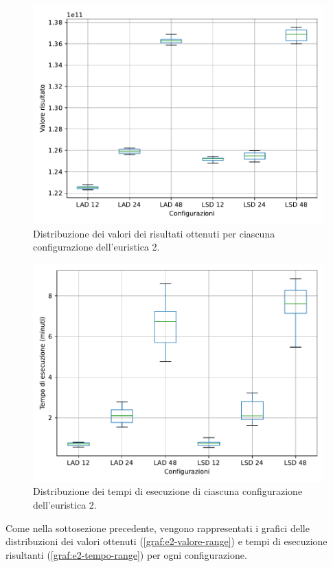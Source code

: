 \begin{figure}[t]
    \centering
    \includegraphics[scale=0.70]{img/grafico-e2-valore.pdf}
    \caption{Distribuzione dei valori dei risultati ottenuti per ciascuna configurazione dell'euristica 2.}
    \label{graf:e2-valore-range}
\end{figure}

\begin{figure}[t]
    \centering
    \includegraphics[scale=0.70]{img/grafico-e2-tempo.pdf}
    \caption{Distribuzione dei tempi di esecuzione di ciascuna configurazione dell'euristica 2.}
    \label{graf:e2-tempo-range}
\end{figure}

Come nella sottosezione precedente, vengono rappresentati i grafici delle distribuzioni dei valori ottenuti (\autoref{graf:e2-valore-range}) e tempi di esecuzione risultanti (\autoref{graf:e2-tempo-range}) per ogni configurazione.

